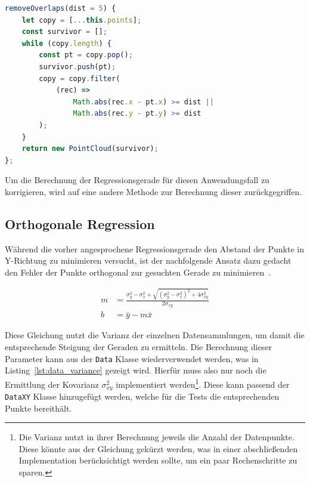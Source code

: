 \begin{lstlisting}[language=JavaScript, caption={Definition der \lstinline{removeOverlaps} Funktion der \lstinline{PointCloud} Klasse.}, label={lst:pointcloud_removeOverlaps}]
removeOverlaps(dist = 5) {
    let copy = [...this.points];
    const survivor = [];
    while (copy.length) {
        const pt = copy.pop();
        survivor.push(pt);
        copy = copy.filter(
            (rec) =>
                Math.abs(rec.x - pt.x) >= dist ||
                Math.abs(rec.y - pt.y) >= dist
        );
    }
    return new PointCloud(survivor);
};
\end{lstlisting}

Um die Berechnung der Regressionsgerade für diesen Anwendungsfall zu korrigieren, wird auf eine andere Methode zur Berechnung dieser zurückgegriffen.

\subsection{Orthogonale Regression}\label{ch:orthogonale_regression}

Während die vorher angesprochene Regressionsgerade den Abstand der Punkte in Y-Richtung zu minimieren versucht, ist der nachfolgende Ansatz dazu gedacht den Fehler der Punkte orthogonal zur gesuchten Gerade zu minimieren~\cite[S.~140]{JuergenHedderich2020}.

\begin{equation}
    \begin{split}
        m &= \frac{\sigma_y^2 - \sigma_x^2 + \sqrt{(\sigma_y^2 - \sigma_x^2)^2 + 4\sigma_{xy}^2}}{2\sigma_{xy}} \\
        b &= \bar{y} - m \bar{x}
    \end{split}
    \label{eq:orthogonal_regression}
\end{equation}

Diese Gleichung nutzt die Varianz der einzelnen Datensammlungen, um damit die entsprechende Steigung der Geraden zu ermitteln.
Die Berechnung dieser Parameter kann aus der \lstinline{Data} Klasse wiederverwendet werden, was in Listing~\ref{lst:data_variance} gezeigt wird.
Hierfür muss also nur noch die Ermittlung der Kovarianz $\sigma_{xy}^2$ implementiert werden\footnote{Die Varianz nutzt in ihrer Berechnung jeweils die Anzahl der Datenpunkte. Diese könnte aus der Gleichung gekürzt werden, was in einer abschlie{\ss}enden Implementation berücksichtigt werden sollte, um ein paar Rechenschritte zu sparen.}.
Diese kann passend der \lstinline{DataXY} Klasse hinzugefügt werden, welche für die Tests die entsprechenden Punkte bereithält.

